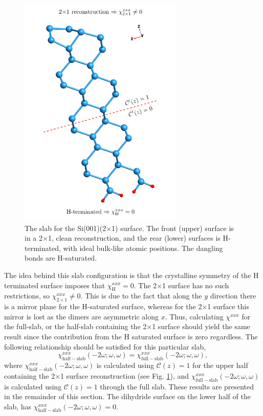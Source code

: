 {\begin{figure}
\centering 
\includegraphics[width=0.7\textwidth]{figures/fig-4_1_01}
\caption{The slab for the Si(001)(2$\times$1) surface. The front (upper) surface
is in a 2$\times$1, clean reconstruction, and the rear (lower) surfaces is
H-terminated, with ideal bulk-like atomic positions. The dangling bonds are
H-saturated.}
\label{fig:si2x1}
\end{figure} 

The idea behind this slab configuration is that the crystalline symmetry of the
H terminated surface imposes that $\chi_{\mathrm{H}}^{xxx}=0$. The 2$\times$1
surface has no such restrictions, so $\chi_{2\times 1}^{xxx}\ne 0$. This is due
to the fact that along the $y$ direction there is a mirror plane for the
H-saturated surface, whereas for the 2$\times$1 surface this mirror is lost as
the dimers are asymmetric along $x$. Thus, calculating $\chi^{xxx}$ for the
full-slab, or the half-slab containing the 2$\times$1 surface \cite{note1}
should yield the same result since the contribution from the H saturated surface
is zero regardless. The following relationship should be satisfied for this
particular slab,
\begin{equation*}
\chi_{\mathrm{half-slab}}^{xxx}(-2\omega;\omega,\omega) =
\chi_{\mathrm{full-slab}}^{xxx}(-2\omega;\omega,\omega),
\end{equation*}
where $\chi_{\mathrm{half-slab}}^{xxx}(-2\omega;\omega,\omega)$ is calculated
using ${\mathbf{\mathcal{C}}}(z)=1$ for the upper half containing the 2$\times$1
surface reconstruction (see Fig. \ref{fig:si2x1}), and
$\chi_{\mathrm{full-slab}}^{xxx}(-2\omega;\omega,\omega)$ is calculated using
${\mathbf{\mathcal{C}}}(z)=1$ through the full slab. These results are presented
in the remainder of this section. The dihydride surface on the lower half of the
slab, has $\chi_{\mathrm{half-slab}}^{xxx}(-2\omega;\omega,\omega)=0$.

}
